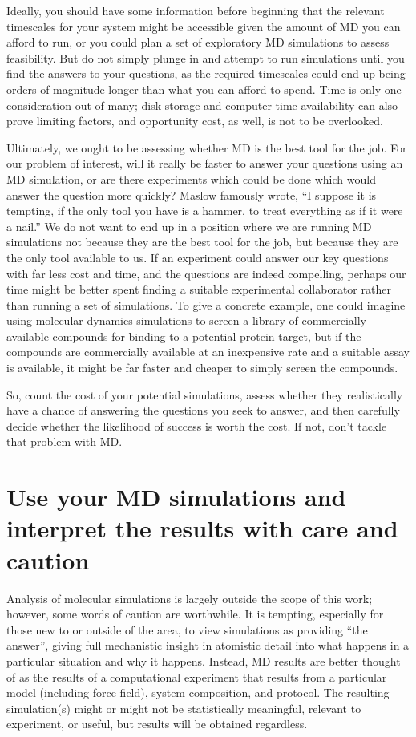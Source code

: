 \documentclass[9pt,bestpractices]{livecoms}
\begin{document}
Ideally, you should have some information before beginning that the relevant timescales for your system might be accessible given the amount of MD you can afford to run, or you could plan a set of exploratory MD simulations to assess feasibility.
But do not simply plunge in and attempt to run simulations until you find the answers to your questions, as the required timescales could end up being orders of magnitude longer than what you can afford to spend.
Time is only one consideration out of many; disk storage and computer time availability can also prove limiting factors, and opportunity cost, as well, is not to be overlooked.

Ultimately, we ought to be assessing whether MD is the best tool for the job.
For our problem of interest, will it really be faster to answer your questions using an MD simulation, or are there experiments which could be done which would answer the question more quickly?
Maslow famously wrote, ``I suppose it is tempting, if the only tool you have is a hammer, to treat everything as if it were a nail.''
We do not want to end up in a position where we are running MD simulations not because they are the best tool for the job, but because they are the only tool available to us.
If an experiment could answer our key questions with far less cost and time, and the questions are indeed compelling, perhaps our time might be better spent finding a suitable experimental collaborator rather than running a set of simulations.
To give a concrete example, one could imagine using molecular dynamics simulations to screen a library of commercially available compounds for binding to a potential protein target, but if the compounds are commercially available at an inexpensive rate and a suitable assay is available, it might be far faster and cheaper to simply screen the compounds.

So, count the cost of your potential simulations, assess whether they realistically have a chance of answering the questions you seek to answer, and then carefully decide whether the likelihood of success is worth the cost.
If not, don't tackle that problem with MD.

\section{Use your MD simulations and interpret the results with care and caution}

Analysis of molecular simulations is largely outside the scope of this work; however, some words of caution are worthwhile.
It is tempting, especially for those new to or outside of the area, to view simulations as providing ``the answer'', giving full mechanistic insight in atomistic detail into what happens in a particular situation and why it happens.
Instead, MD results are better thought of as the results of a computational experiment that results from a particular model (including force field), system composition, and protocol.
The resulting simulation(s) might or might not be statistically meaningful, relevant to experiment, or useful, but results will be obtained regardless.
\end{document}
